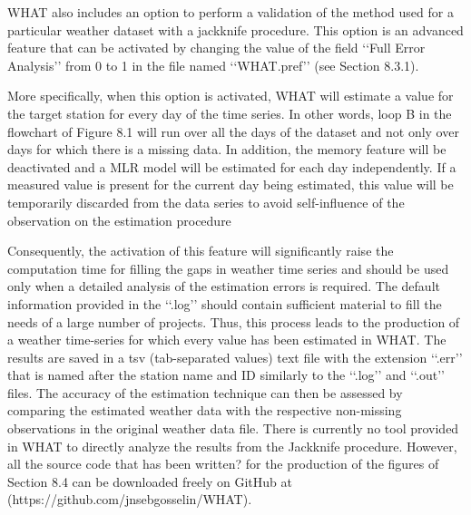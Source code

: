 \documentclass[ARTICLETHERMIC.tex]{subfiles}
\begin{document}
WHAT also includes an option to perform a validation of the method used for a particular weather dataset with a jackknife procedure. This option is an advanced feature that can be activated by changing the value of the field ‘‘Full Error Analysis’’ from 0 to 1 in the file named ‘‘WHAT.pref’’ (see Section 8.3.1).

More specifically, when this option is activated, WHAT will estimate a value for the target station for every day of the time series. In other words, loop B in the flowchart of Figure 8.1 will run over all the days of the dataset and not only over days for which there is a missing data. In addition, the memory feature will be deactivated and a MLR model will be estimated for each day independently. If a measured value is present for the current day being estimated, this value will be temporarily discarded from the data series to avoid self-influence of the observation on the estimation procedure

Consequently, the activation of this feature will significantly raise the computation time for filling the gaps in weather time series and should be used only when a detailed analysis of the estimation errors is required. The default information provided in the ‘‘.log’’ should contain sufficient material to fill the needs of a large number of projects. Thus, this process leads to the production of a weather time-series for which every value has been estimated in WHAT. The results are saved in a tsv (tab-separated values) text file with the extension ‘‘.err’’ that is named after the station name and ID similarly to the ‘‘.log’’ and ‘‘.out’’ files.
The accuracy of the estimation technique can then be assessed by comparing the estimated weather data with the respective non-missing observations in the original weather data file. There is currently no tool provided in WHAT to directly analyze the results from the Jackknife procedure. However, all the source code that has been written? for the production of the figures of Section 8.4 can be downloaded freely on GitHub at (https://github.com/jnsebgosselin/WHAT).
\end{document}
